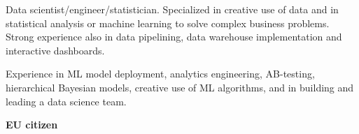 

\begin{cvparagraph}
\begin{minipage}[t]{0.4\textwidth} %
Data scientist/engineer/statistician. Specialized in creative use of data and in statistical
analysis or machine learning to solve complex business problems. Strong experience also
in data pipelining, data warehouse implementation and interactive dashboards.

Experience in ML model deployment, analytics engineering, AB-testing, hierarchical Bayesian models,
creative use of ML algorithms, and in building and leading a data science team.

\medskip
\textbf{EU citizen}

\end{minipage}
\hfill
\begin{minipage}[t]{0.55\textwidth} %

\end{minipage}
\end{cvparagraph}
